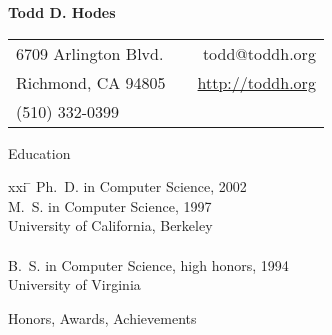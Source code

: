 \setlength{\oddsidemargin}{0.25 in}
\setlength{\evensidemargin}{-0.25 in}
\setlength{\topmargin}{-0.95 in}
\setlength{\textwidth}{6.5 in}
\setlength{\textheight}{10 in}
\setlength{\headsep}{0.35 in}
\setlength{\parindent}{0 in}
\setlength{\parskip}{0.01 in}


\addtolength{\evensidemargin}{-15pt}
\addtolength{\oddsidemargin}{-15pt}

\pagestyle{empty}


\begin{center} \bf
\Large
                               Todd D. Hodes
\medskip
\normalsize


\begin{tabular}{lp{3.5in}r}
6709 Arlington Blvd.  & & todd@toddh.org \\
Richmond, CA  94805 & & \url{http://toddh.org} \\
(510)  332-0399 \\
\end{tabular}

\end{center}

\bigskip


\begin{bf} \large
Education \\[-18pt]
\end{bf}

\begin{tabbing}
xxi \= \kill
\>   Ph.\ D. in Computer Science, 2002 \\
\>   M.\ S. in  Computer Science, 1997 \\
\>   University of California, Berkeley \\
\smallskip \\[-6pt]
\>   B.\ S. in Computer Science, high honors, 1994 \\
\>   University of Virginia \\
\end{tabbing}

\begin{bf} \large
Honors, Awards, Achievements  \\[-16pt]
\end{bf}

